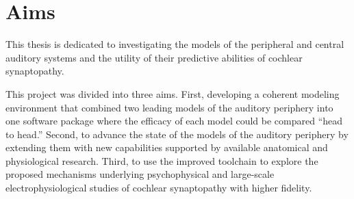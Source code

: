 \chapter{Aims}
\label{chapter:Aims}
\thispagestyle{myheadings}

\graphicspath{{3_Aims/Figures/}}

This thesis is dedicated to investigating the models of the peripheral and central auditory systems and the utility of their predictive abilities of cochlear synaptopathy. 

This project was divided into three aims.  First, developing a coherent modeling environment that combined two leading models of the auditory periphery into one software package where the efficacy of each model could be compared ``head to head.''  Second, to advance the state of the models of the auditory periphery by extending them with new capabilities supported by available anatomical and physiological research.  Third, to use the improved toolchain to explore the proposed mechanisms underlying psychophysical and large-scale electrophysiological studies of cochlear synaptopathy with higher fidelity.

